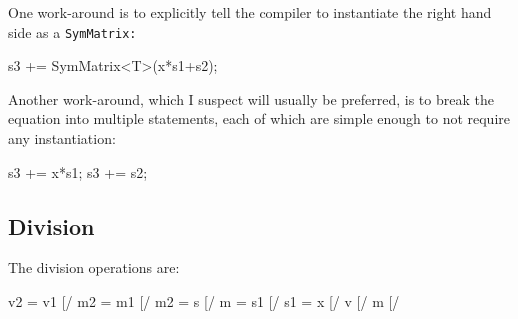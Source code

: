 One work-around is to explicitly tell the compiler to instantiate the right hand
side as a \tt{SymMatrix}:
\begin{tmvcode}
s3 += SymMatrix<T>(x*s1+s2);
\end{tmvcode}

Another work-around, which I suspect will usually be preferred, is to break the 
equation into multiple statements, each of which are simple enough to not require
any instantiation:
\begin{tmvcode}
s3 += x*s1;
s3 += s2;
\end{tmvcode}

\subsection{Division}
\label{SymMatrix_Division}

The division operations are:
\begin{tmvcode}
v2 = v1 [/%
m2 = m1 [/%
m2 = s [/%
m = s1 [/%
s1 = x [/%
v [/%
m [/%
\end{tmvcode}

